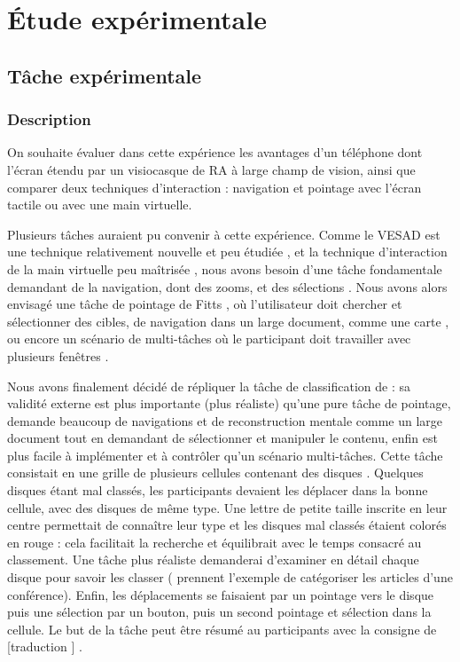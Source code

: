 \chapter{Étude expérimentale}
\label{ch:experiment}

\section{Tâche expérimentale}
\label{sec:experiment_task}

\subsection{Description}
\label{subsec:experiment_task_description}

On souhaite évaluer dans cette expérience les avantages d'un téléphone dont l'écran étendu par un visiocasque de RA à large champ de vision, ainsi que comparer deux techniques d'interaction : navigation et pointage avec l'écran tactile ou avec une main virtuelle.

Plusieurs tâches auraient pu convenir à cette expérience. Comme le VESAD est une technique relativement nouvelle et peu étudiée \citep{Grubert2015}, et la technique d'interaction de la main virtuelle peu maîtrisée \citep{Argelaguet2013, Piumsomboon2013}, nous avons besoin d'une tâche fondamentale demandant de la navigation, dont des zooms, et des sélections \citep{Bowman2004}. Nous avons alors envisagé une tâche de pointage de Fitts \citep{Soukoreff2004, Berge2014}, où l'utilisateur doit chercher et sélectionner des cibles, de navigation dans un large document, comme une carte \citep{Baudisch2002, Raedle2014}, ou encore un scénario de multi-tâches où le participant doit travailler avec plusieurs fenêtres \citep{Czerwinski2003, Ens2014}.

Nous avons finalement décidé de répliquer la tâche de classification de \cite{Liu2014} : sa validité externe est plus importante (plus réaliste) qu'une pure tâche de pointage, demande beaucoup de navigations et de reconstruction mentale comme un large document tout en demandant de sélectionner et manipuler le contenu, enfin est plus facile à implémenter et à contrôler qu'un scénario multi-tâches. Cette tâche consistait en une grille de plusieurs cellules contenant des disques . Quelques disques étant mal classés, les participants devaient les déplacer dans la bonne cellule, avec des disques de même type. Une lettre de petite taille inscrite en leur centre permettait de connaître leur type et les disques mal classés étaient colorés en rouge : cela facilitait la recherche et équilibrait avec le temps consacré au classement. Une tâche plus réaliste demanderai d'examiner en détail chaque disque pour savoir les classer (\citeauthor{Liu2014} prennent l'exemple de catégoriser les articles d'une conférence). Enfin, les déplacements se faisaient par un pointage vers le disque puis une sélection par un bouton, puis un second pointage et sélection dans la cellule. Le but de la tâche peut être résumé au participants avec la consigne de [traduction ] \citep{Liu2014}.


